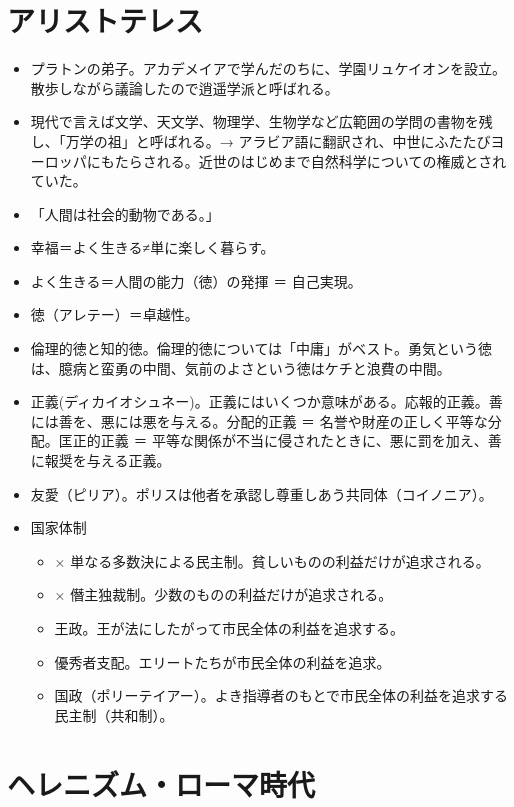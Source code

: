 \documentclass[uplatex,dvipdfmx]{jsarticle} \usepackage{mystyle}%
\begin{document}
\section{アリストテレス}
\begin{itemize}
\item プラトンの弟子。アカデメイアで学んだのちに、学園リュケイオンを設立。散歩しながら議論したので逍遥学派と呼ばれる。
\item 現代で言えば文学、天文学、物理学、生物学など広範囲の学問の書物を残し、「万学の祖」と呼ばれる。→ アラビア語に翻訳され、中世にふたたびヨーロッパにもたらされる。近世のはじめまで自然科学についての権威とされていた。
\item 「人間は社会的動物である。」
\item 幸福＝よく生きる≠単に楽しく暮らす。
\item よく生きる＝人間の能力（徳）の発揮 ＝ 自己実現。
\item 徳（アレテー）＝卓越性。
\item 倫理的徳と知的徳。倫理的徳については「中庸」がベスト。勇気という徳は、臆病と蛮勇の中間、気前のよさという徳はケチと浪費の中間。
\item 正義(ディカイオシュネー)。正義にはいくつか意味がある。応報的正義。善には善を、悪には悪を与える。分配的正義 ＝ 名誉や財産の正しく平等な分配。匡正的正義 ＝ 平等な関係が不当に侵されたときに、悪に罰を加え、善に報奨を与える正義。
\item 友愛（ピリア）。ポリスは他者を承認し尊重しあう共同体（コイノニア）。

\item 国家体制
  \begin{itemize}
  \item × 単なる多数決による民主制。貧しいものの利益だけが追求される。
  \item × 僭主独裁制。少数のものの利益だけが追求される。
  \item 王政。王が法にしたがって市民全体の利益を追求する。
  \item 優秀者支配。エリートたちが市民全体の利益を追求。
  \item 国政（ポリーテイアー）。よき指導者のもとで市民全体の利益を追求する民主制（共和制）。
  \end{itemize}
\end{itemize}


\section{ヘレニズム・ローマ時代}
\end{document}
